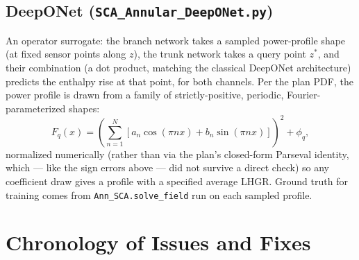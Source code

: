 \documentclass[11pt]{article}
\begin{document}
\subsection{DeepONet (\texttt{SCA\_Annular\_DeepONet.py})}

An operator surrogate: the branch network takes a sampled power-profile
shape (at fixed sensor points along $z$), the trunk network takes a query
point $z^*$, and their combination (a dot product, matching the classical
DeepONet architecture) predicts the enthalpy rise at that point, for both
channels. Per the plan PDF, the power profile is drawn from a family of
strictly-positive, periodic, Fourier-parameterized shapes:
\begin{equation}
F_q(x) = \left(\sum_{n=1}^N \left[a_n\cos(\pi n x) + b_n\sin(\pi n x)\right]\right)^2 + \phi_q,
\end{equation}
normalized numerically (rather than via the plan's closed-form Parseval
identity, which --- like the sign errors above --- did not survive a
direct check) so any coefficient draw gives a profile with a specified
average LHGR. Ground truth for training comes from
\texttt{Ann\_SCA.solve\_field} run on each sampled profile.

\section{Chronology of Issues and Fixes}
\label{sec:chronology}
\end{document}
